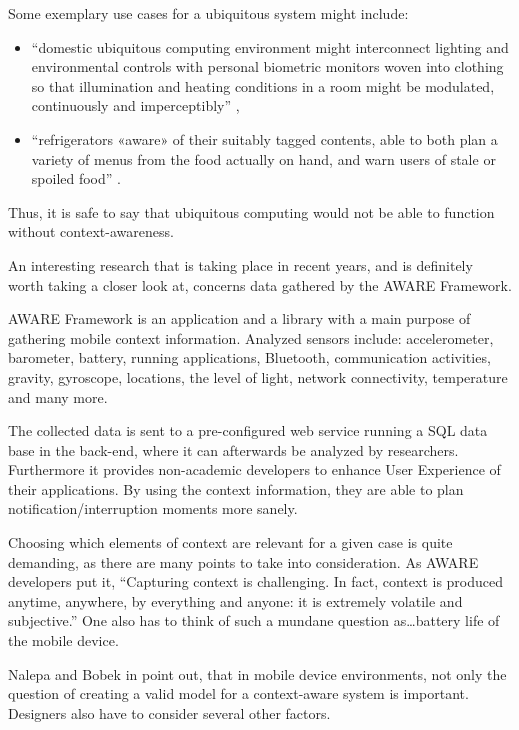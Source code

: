 Some exemplary use cases for a ubiquitous system might include:

\begin{itemize}
	\item ``domestic ubiquitous computing environment might interconnect lighting and environmental controls with personal biometric monitors woven into clothing so that illumination and heating conditions in a room might be modulated, continuously and imperceptibly'' \cite{wiki:ubiquitous},
	\item ``refrigerators «aware» of their suitably tagged contents, able to both plan a variety of menus from the food actually on hand, and warn users of stale or spoiled food'' \cite{wiki:ubiquitous}.
\end{itemize}

Thus, it is safe to say that ubiquitous computing would not be able to function without context-awareness.

An interesting research that is taking place in recent years, and is definitely worth taking a closer look at, concerns data gathered by the AWARE Framework.

AWARE Framework is an application and a library with a main purpose of gathering mobile context information. Analyzed sensors include: accelerometer, barometer, battery, running applications, Bluetooth, communication activities, gravity, gyroscope, locations, the level of light, network connectivity, temperature and many more. \cite{aware}

The collected data is sent to a pre-configured web service running a SQL data base in the back-end, where it can afterwards be analyzed by researchers. Furthermore it provides non-academic developers to enhance User Experience of their applications. By using the context information, they are able to plan notification/interruption moments more sanely. \cite{aware}

Choosing which elements of context are relevant for a given case is quite demanding, as there are many points to take into consideration. As AWARE developers put it, ``Capturing context is challenging. In fact, context is produced anytime, anywhere, by everything and anyone: it is extremely volatile and subjective.'' \cite{aware} One also has to think of such a mundane question as\ldots battery life of the mobile device.

Nalepa and Bobek in \cite{Bobek:rule-mobile-context} point out, that in mobile device environments, not only the question of creating a valid model for a context-aware system is important. Designers also have to consider several other factors.

